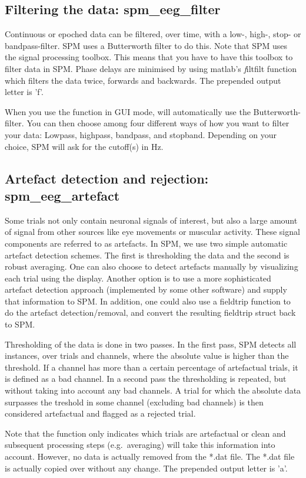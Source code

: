 \subsection{Filtering the data: spm\_eeg\_filter}
Continuous or epoched data can be filtered, over time, with a low-,
high-, stop- or bandpass-filter. SPM uses a Butterworth filter to do this. Note that
SPM uses the signal processing toolbox. This means that you have to
have this toolbox to filter data in SPM. Phase delays are minimised by
using matlab's {\textit filtfilt} function which filters the data
twice, forwards and backwards. The prepended output letter is 'f'.

When you use the function in GUI mode, will automatically use the Butterworth-filter. You can then choose among four different ways of how you want to filter your data: Lowpass, highpass, bandpass, and stopband. Depending on your choice, SPM will ask for the cutoff(s) in Hz.


\subsection{Artefact detection and rejection: spm\_eeg\_artefact}
Some trials not only contain neuronal signals of
interest, but also a large amount of signal from other sources like
eye movements or muscular activity. These signal components are
referred to as artefacts. In SPM, we use two simple automatic
artefact detection schemes. The first is thresholding the data and the
second is robust averaging. One can also choose to detect artefacts
manually by visualizing each trial using the display. Another option
is to use a more sophisticated artefact detection approach
(implemented by some other software) and supply that information to
SPM. In addition, one could also use a fieldtrip function to do the
artefact detection/removal, and convert the resulting fieldtrip struct
back to SPM.

Thresholding of the data is done in two passes. In the first pass, SPM
detects all instances, over trials and channels, where the
absolute value is higher than the threshold. If a channel has more
than a certain percentage of artefactual trials, it is defined as a
bad channel. In a second pass the thresholding is repeated, but
without taking into account any bad channels. A trial for which the
absolute data surpasses the treshold in some channel (excluding bad
channels) is then considered artefactual and flagged as a rejected
trial.

Note that the function only indicates which trials are artefactual or
clean and subsequent processing steps (e.g.~averaging) will take this 
information into account. However, no data is actually removed from
the *.dat file. The *.dat file is actually copied over without any
change. The prepended output letter is 'a'.

